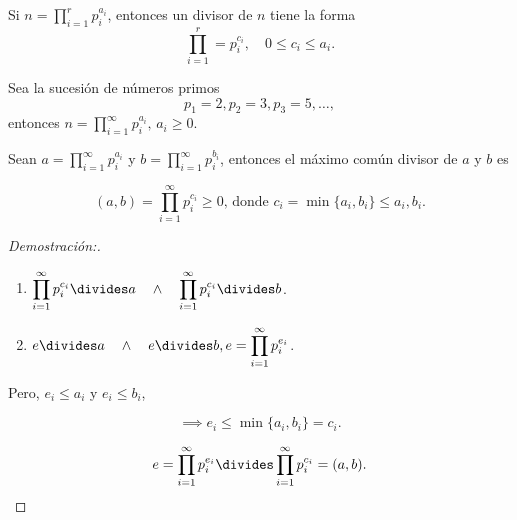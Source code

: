 \documentclass[oneside,a5paper]{memoir}
\begin{document}
\begin{theorem}

Si $\displaystyle n=\prod_{i=1}^{r}{p}^{a_i}_{i}$, entonces un divisor de $n$ tiene la forma
\[\prod_{i=1}^{r}={p}^{c_i}_{i},\quad0\leq c_i\leq a_i.\]

\end{theorem}

\begin{remark}

Sea la sucesión de números primos
\[p_1=2, p_2=3, p_3=5, \ldots,\]
entonces $\displaystyle n=\prod_{i=1}^{\infty}{p}^{a_i}_{i},\, a_i\geq0$.

\end{remark}

\begin{theorem}

Sean $\displaystyle a=\prod_{i=1}^{\infty}{p}^{a_i}_{i}$ y $\displaystyle b=\prod_{i=1}^{\infty}{p}^{b_i}_{i}$, entonces el máximo común divisor de $a$ y $b$ es

\[(a,b)=\displaystyle\prod_{i=1}^{\infty}{p}^{c_i}_{i}\geq0\text{, donde }c_i=\min\{a_i,b_i\}\leq a_i,b_i.\]

\begin{proof}[Demostración:]

\begin{enumerate}[font={\bfseries},label={*)}]

\item $\displaystyle\prod_{i=1}^{\infty}{p}^{c_i}_{i}\divides a\quad\wedge\quad\prod_{i=1}^{\infty}{p}^{c_i}_{i}\divides b$.

\item $e\divides a\quad\wedge\quad e\divides b, e=\displaystyle\prod_{i=1}^{\infty}{p}^{e_i}_{i}$.

\end{enumerate}

\noindent
Pero, $e_i\leq a_i$ y $e_i\leq b_i$,

\[\implies e_i\leq\min\{a_i,b_i\}=c_i.\]

\[e=\prod_{i=1}^{\infty}{p}^{e_i}_{i}\divides\prod_{i=1}^{\infty}{p}^{c_i}_{i}=(a,b).\]
\end{proof}

\end{theorem}
\end{document}
